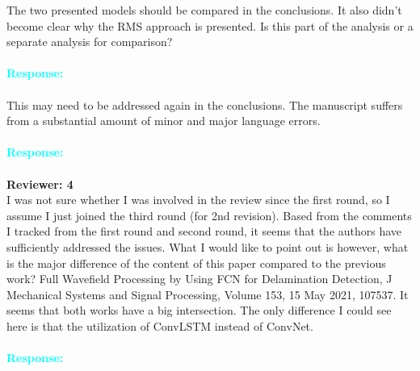 \documentclass[11pt,a2paper]{report}
\begin{document}
	The two presented models should be compared in the conclusions. 
	It also didn't become clear why the RMS approach is presented. 
	Is this part of the analysis or a separate analysis for comparison? 
		\\ \\
	\textcolor{Cyan}{
		\textbf{Response:}}
	\\ \\
	This may need to be addressed again in the conclusions.
	The manuscript suffers from a substantial amount of minor and major language errors.
		\\ \\
	\textcolor{Cyan}{
		\textbf{Response:}}
	\\ \\
	\newpage
	\textbf{Reviewer: 4}  \\
	I was not sure whether I was involved in the review since the first round, so I assume I just joined the third round (for 2nd revision).
	Based from the comments I tracked from the first round and second round, it seems that the authors have sufficiently addressed the issues.
	What I would like to point out is however, what is the major difference of the content of this paper compared to the previous work?
	Full Wavefield Processing by Using FCN for Delamination Detection, J Mechanical Systems and Signal Processing, Volume 153, 15 May 2021, 107537.
	It seems that both works have a big intersection. The only difference I could see here is that the utilization of ConvLSTM instead of ConvNet.	
		\\ \\
	\textcolor{Cyan}{
		\textbf{Response:}}
	\\ \\
\end{document}
